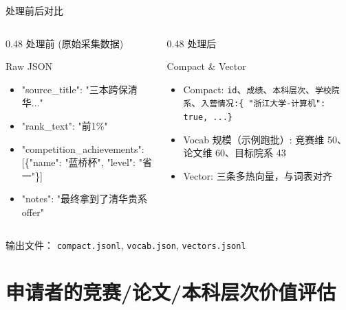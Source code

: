 \documentclass[10pt, aspectratio=169]{beamer}
\begin{document}
\begin{frame}{处理前后对比}
    \begin{columns}
        \begin{column}{0.48\textwidth}
            处理前 (原始采集数据)
            \begin{block}{Raw JSON}
                {\tiny
                \begin{itemize}
                    \item "source\_title": "三本跨保清华..."
                    \item "rank\_text": "前1\%"
                    \item "competition\_achievements": [\{"name": "蓝桥杯", "level": "省一"\}]
                    \item "notes": "最终拿到了清华贵系offer"
                \end{itemize}
                }
            \end{block}
        \end{column}
        
        \begin{column}{0.48\textwidth}
            处理后
            \begin{block}{Compact \& Vector}
                {\tiny
                \begin{itemize}
                    \item Compact: \texttt{id}、\texttt{成绩}、\texttt{本科层次}、\texttt{学校院系}、\texttt{入营情况:\{ "浙江大学-计算机": true, ...\}}
                    \item Vocab 规模（示例跑批）: 竞赛维 50、论文维 60、目标院系 43
                    \item Vector: 三条多热向量，与词表对齐
                \end{itemize}
                }
            \end{block}
        \end{column}
    \end{columns}
    \vspace{0.5cm}
    \centering
    输出文件： \texttt{compact.jsonl}, \texttt{vocab.json}, \texttt{vectors.jsonl}
\end{frame}


\section{申请者的竞赛/论文/本科层次价值评估}
\end{document}
